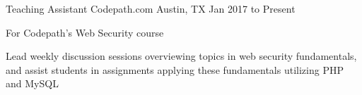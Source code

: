 \begin{cventries}
	\cventry
		{Teaching Assistant}
		{Codepath.com}
		{Austin, TX}
		{Jan 2017 to Present}
		{
			\begin{cvitems}
				\item {For Codepath's Web Security course}
				\item {Lead weekly discussion sessions overviewing topics in web security fundamentals, and assist students in assignments applying these fundamentals utilizing PHP and MySQL}
			\end{cvitems}
		}
\end{cventries}